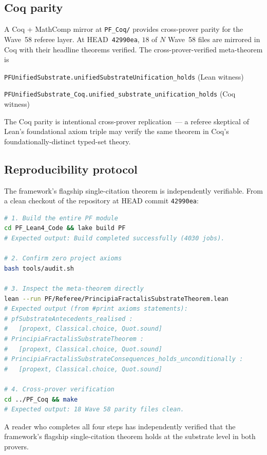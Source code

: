 \documentclass[11pt,a4paper]{article}
\theoremstyle{definition}
\theoremstyle{remark}
\newcommand{\lean}[1]{\texttt{\small #1}}
\begin{document}
\subsection{Coq parity}

A Coq + MathComp mirror at \texttt{PF\_Coq/} provides cross-prover
parity for the Wave~58 referee layer. At HEAD~\texttt{42990ea},
$18$ of $N$ Wave~58 files are mirrored in Coq with their headline
theorems verified. The cross-prover-verified meta-theorem is

\smallskip
\lean{PFUnifiedSubstrate.unifiedSubstrateUnification\_holds}
\hfill (Lean witness)

\noindent\lean{PFUnifiedSubstrate\_Coq.unified\_substrate\_unification\_holds}
\hfill (Coq witness)

\smallskip
\noindent The Coq parity is intentional cross-prover replication~---
a referee skeptical of Lean's foundational axiom triple may verify
the same theorem in Coq's foundationally-distinct typed-set theory.

\subsection{Reproducibility protocol}

The framework's flagship single-citation theorem is independently
verifiable. From a clean checkout of the repository at HEAD commit
\texttt{42990ea}:

\begin{lstlisting}[language=bash]
# 1. Build the entire PF module
cd PF_Lean4_Code && lake build PF
# Expected output: Build completed successfully (4030 jobs).

# 2. Confirm zero project axioms
bash tools/audit.sh

# 3. Inspect the meta-theorem directly
lean --run PF/Referee/PrincipiaFractalisSubstrateTheorem.lean
# Expected output (from #print axioms statements):
# pfSubstrateAntecedents_realised :
#   [propext, Classical.choice, Quot.sound]
# PrincipiaFractalisSubstrateTheorem :
#   [propext, Classical.choice, Quot.sound]
# PrincipiaFractalisSubstrateConsequences_holds_unconditionally :
#   [propext, Classical.choice, Quot.sound]

# 4. Cross-prover verification
cd ../PF_Coq && make
# Expected output: 18 Wave 58 parity files clean.
\end{lstlisting}

A reader who completes all four steps has independently verified
that the framework's flagship single-citation theorem holds at the
substrate level in both provers.
\end{document}
